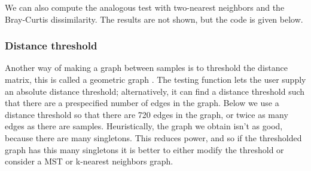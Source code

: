 We can also compute the analogous test with two-nearest neighbors and the
Bray-Curtis dissimilarity. The results are not shown, but the code is
given below.

\begin{knitrout}
\color{fgcolor}\begin{kframe}
\begin{alltt}
 \hlkwb{<-}  \hlstd{,}
                       \hlstd{=} \hlstd{,}
                       \hlstd{=} \hlstd{,}  \hlstd{=} \hlstd{,}  \hlstd{=} \hlstd{)}
\end{alltt}
\end{kframe}
\end{knitrout}



\subsubsection*{Distance threshold}

Another way of making a graph between samples is to threshold the
distance matrix, this is called a geometric graph \cite{Penrose2003}.
The testing function lets the user supply an absolute distance
threshold; alternatively, it can find a distance threshold
such that there are a prespecified number of edges in the graph. Below
we use a distance threshold so that there are 720 edges in the
graph, or twice as many edges as there are samples. Heuristically, the
graph we obtain isn't as good, because there are many singletons. This
reduces power, and so if the thresholded graph has this many
singletons it is better to either modify the threshold or consider a
MST or k-nearest neighbors graph.

\begin{knitrout}
\color{fgcolor}\begin{kframe}
\begin{alltt}
 \hlkwb{<-}  \hlstd{,}  \hlstd{=} \hlstd{,}
                       \hlstd{=} \hlstd{,}  \hlstd{=} \hlstd{,}  \hlstd{=} \hlstd{,}
                       \hlstd{=} \hlstd{)}
\end{alltt}
\end{kframe}
\end{knitrout}

